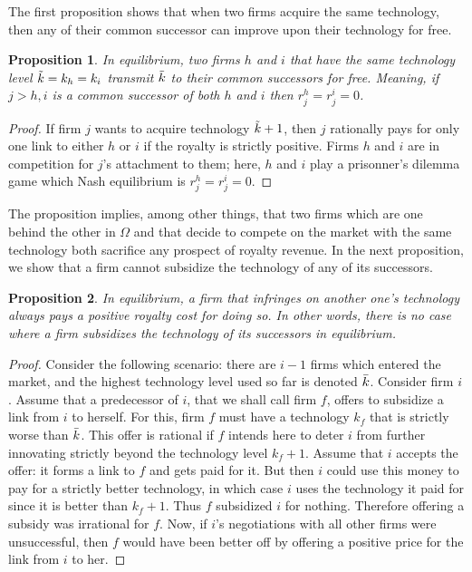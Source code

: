\documentclass{article}
\newtheorem{proposition}{Proposition}
\begin{document}
The first proposition shows that when two firms acquire the same technology, then any of their common successor can improve upon their technology for free. \\ 

\begin{proposition}\label{prop:zerorevenue}
In equilibrium, two firms $h$ and $i$ that have the same technology level $\Tilde{k}=k_h=k_i$ transmit $\Tilde{k}$ to their common successors for free. Meaning, if $j>h,i$ is a common successor of both $h$ and $i$ then $r^{h}_j=r^{i}_j=0$. 
\end{proposition}
\begin{proof}
If firm $j$ wants to acquire technology $\Tilde{k}+1$, then $j$ rationally pays for only one link to either $h$ or $i$ if the royalty is strictly positive. Firms $h$ and $i$ are in competition for $j$'s attachment to them; here, $h$ and $i$ play a prisonner's dilemma game which Nash equilibrium is $r^{h}_j=r^{i}_j=0$.
\end{proof}

The proposition implies, among other things, that two firms which are one behind the other in $\Omega$ and that decide to compete on the market with the same technology both sacrifice any prospect of royalty revenue. In the next proposition, we show that a firm cannot subsidize the technology of any of its successors. \\

\begin{proposition}\label{prop:positiveroyality}
In equilibrium, a firm that infringes on another one's technology always pays a positive royalty cost for doing so. In other words, there is no case where a firm subsidizes the technology of its successors in equilibrium.
\end{proposition}
\begin{proof}
Consider the following scenario: there are $i-1$ firms which entered the market, and the highest technology level used so far is denoted $\Bar{k}$. Consider firm $i$. Assume that a predecessor of $i$, that we shall call firm $f$, offers to subsidize a link from $i$ to herself. For this, firm $f$ must have a technology $k_f$ that is strictly worse than $\Bar{k}$. This offer is rational if $f$ intends here to deter $i$ from further innovating strictly beyond the technology level $k_f+1$. Assume that $i$ accepts the offer: it forms a link to $f$ and gets paid for it. But then $i$ could use this money to pay for a strictly better technology, in which case $i$ uses the technology it paid for since it is better than $k_f+1$. Thus $f$ subsidized $i$ for nothing. Therefore offering a subsidy was irrational for $f$. Now, if $i$'s negotiations with all other firms were unsuccessful, then $f$ would have been better off by offering a positive price for the link from $i$ to her. 
\end{proof}
\end{document}
